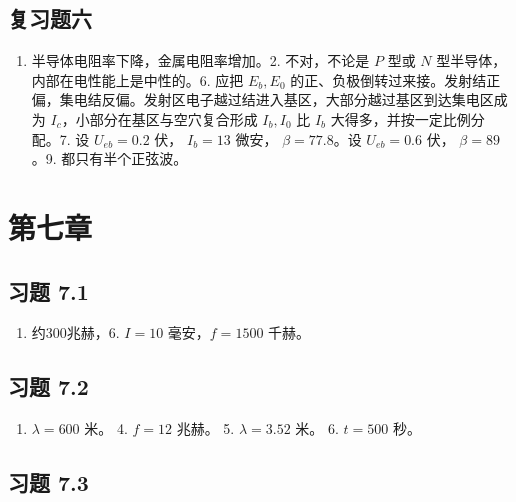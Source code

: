 \subsection{复习题六}\label{ux590dux4e60ux9898ux516d-1}

\begin{enumerate}
\def\labelenumi{\arabic{enumi}.}
\tightlist
\item
  半导体电阻率下降，金属电阻率增加。2. 不对，不论是 \(P\) 型或 \(N\)
  型半导体，内部在电性能上是中性的。6. 应把 \(E_{b}, E_{0}\)
  的正、负极倒转过来接。发射结正偏，集电结反偏。发射区电子越过结进入基区，大部分越过基区到达集电区成为
  \(I_{c}\)，小部分在基区与空穴复合形成 \(I_{b}, I_{0}\) 比 \(I_{b}\)
  大得多，并按一定比例分配。7. 设 \(U_{eb} = 0.2\) 伏， \(I_{b} = 13\)
  微安， \(\beta = 77.8\)。设 \(U_{eb} = 0.6\) 伏， \(\beta = 89\)。9.
  都只有半个正弦波。
\end{enumerate}

\section{第七章}\label{ux7b2cux4e03ux7ae0}

\subsection{习题 7.1}\label{ux4e60ux9898-7.1-1}

\begin{enumerate}
\def\labelenumi{\arabic{enumi}.}
\setcounter{enumi}{4}
\tightlist
\item
  约300兆赫，6. \(I = 10\) 毫安，\(f = 1500\) 千赫。
\end{enumerate}

\subsection{习题 7.2}\label{ux4e60ux9898-7.2-1}

\begin{enumerate}
\def\labelenumi{\arabic{enumi}.}
\setcounter{enumi}{2}
\tightlist
\item
  \(\lambda = 600\) 米。 4. \(f = 12\) 兆赫。 5. \(\lambda = 3.52\) 米。
  6. \(t = 500\) 秒。
\end{enumerate}

\subsection{习题 7.3}\label{ux4e60ux9898-7.3-1}

